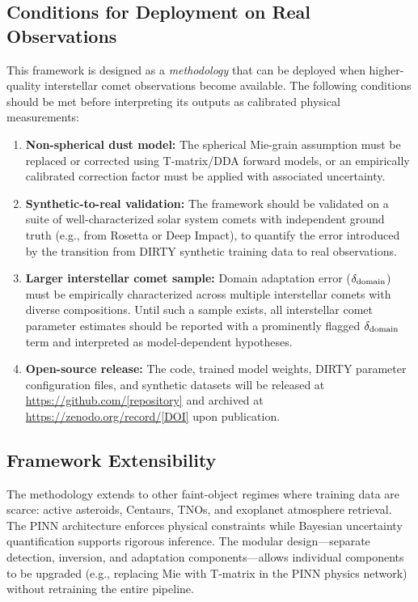 \documentclass[preprint2]{aastex631}
\begin{document}
\subsection{Conditions for Deployment on Real Observations}

This framework is designed as a \textit{methodology} that can be deployed when higher-quality interstellar comet observations become available. The following conditions should be met before interpreting its outputs as calibrated physical measurements:

\begin{enumerate}
    \item \textbf{Non-spherical dust model:} The spherical Mie-grain assumption must be replaced or corrected using T-matrix/DDA forward models, or an empirically calibrated correction factor must be applied with associated uncertainty.
    \item \textbf{Synthetic-to-real validation:} The framework should be validated on a suite of well-characterized solar system comets with independent ground truth (e.g., from Rosetta or Deep Impact), to quantify the error introduced by the transition from DIRTY synthetic training data to real observations.
    \item \textbf{Larger interstellar comet sample:} Domain adaptation error ($\delta_{\rm domain}$) must be empirically characterized across multiple interstellar comets with diverse compositions. Until such a sample exists, all interstellar comet parameter estimates should be reported with a prominently flagged $\delta_{\rm domain}$ term and interpreted as model-dependent hypotheses.
    \item \textbf{Open-source release:} The code, trained model weights, DIRTY parameter configuration files, and synthetic datasets will be released at \url{https://github.com/[repository]} and archived at \url{https://zenodo.org/record/[DOI]} upon publication.
\end{enumerate}

\subsection{Framework Extensibility}

The methodology extends to other faint-object regimes where training data are scarce: active asteroids, Centaurs, TNOs, and exoplanet atmosphere retrieval. The PINN architecture enforces physical constraints while Bayesian uncertainty quantification supports rigorous inference. The modular design---separate detection, inversion, and adaptation components---allows individual components to be upgraded (e.g., replacing Mie with T-matrix in the PINN physics network) without retraining the entire pipeline.
\end{document}
